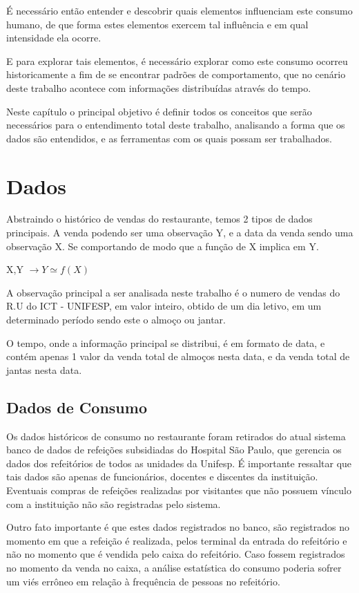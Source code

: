 \documentclass[	12pt, Times, openright, twoside, a4paper, english, brazil]{abntex2}
\begin{document}
É necessário então entender e descobrir quais elementos influenciam este consumo humano, de que forma estes elementos exercem tal influência e em qual intensidade ela ocorre.

E para explorar tais elementos, é necessário explorar como este consumo ocorreu historicamente a fim de se encontrar padrões de comportamento, que no cenário deste trabalho acontece com informações distribuídas através do tempo. 

Neste capítulo o principal objetivo é definir todos os conceitos que serão necessários para o entendimento total deste trabalho, analisando a forma que os dados são entendidos, e as ferramentas com os quais possam ser trabalhados.

\section{Dados}
Abstraindo o histórico de vendas do restaurante, temos 2 tipos de dados principais. A venda podendo ser uma observação Y, e a data da venda sendo uma observação X. Se comportando de modo que a função de X implica em Y. 

X,Y $\rightarrow Y \simeq f(X) $

A observação principal a ser analisada neste trabalho é o numero de vendas do R.U do ICT - UNIFESP, em valor inteiro, obtido de um dia letivo, em um determinado período sendo este o almoço ou jantar.

O tempo, onde a informação principal se distribui, é em formato de data, e contém apenas 1 valor da venda total de almoços nesta data, e da venda total de jantas nesta data.

\subsection{Dados de Consumo}
Os dados históricos de consumo no restaurante foram retirados do atual sistema banco de dados de refeições subsidiadas do Hospital São Paulo, que gerencia os dados dos refeitórios de todos as unidades da Unifesp. É importante ressaltar que tais dados são apenas de funcionários, docentes e discentes da instituição. Eventuais compras de refeições realizadas por visitantes que não possuem vínculo com a instituição não são registradas pelo sistema. 

Outro fato importante é que estes dados registrados no banco, são registrados no momento em que a refeição é realizada, pelos terminal da entrada do refeitório e não no momento que é vendida pelo caixa do refeitório. Caso fossem registrados no momento da venda no caixa, a análise estatística do consumo poderia sofrer um viés errôneo em relação à frequência de pessoas no refeitório. 
\end{document}
